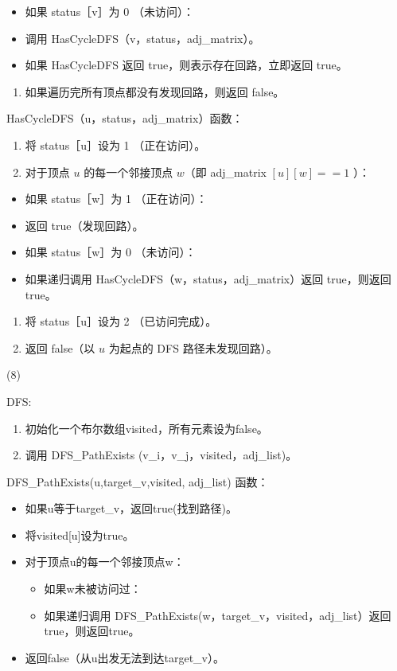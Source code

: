 \begin{itemize}
	\item 如果 status［v］为 0 （未访问）：
	\item 调用 HasCycleDFS（v，status，adj\_matrix）。
	\item 如果 HasCycleDFS 返回 true，则表示存在回路，立即返回 true。
\end{itemize}

\begin{enumerate}
	\item 如果遍历完所有顶点都没有发现回路，则返回 false。
\end{enumerate}

HasCycleDFS（u，status，adj\_matrix）函数：

\begin{enumerate}
	\item 将 status［u］设为 1 （正在访问）。
	\item 对于顶点 $u$ 的每一个邻接顶点 $w$（即 adj\_matrix $[u][w]==1$ ）：
\end{enumerate}

\begin{itemize}
	\item 如果 status［w］为 1 （正在访问）：
	\item 返回 true（发现回路）。
	\item 如果 status［w］为 0 （未访问）：
	\item 如果递归调用 HasCycleDFS（w，status，adj\_matrix）返回 true，则返回 true。
\end{itemize}

\begin{enumerate}
	\item 将 status［u］设为 2 （已访问完成）。
	\item 返回 false（以 $u$ 为起点的 DFS 路径未发现回路）。
\end{enumerate}


(8)

DFS:

\begin{enumerate}
	\item 初始化一个布尔数组visited，所有元素设为false。
	\item 调用 DFS\_PathExists (v\_i，v\_j，visited，adj\_list)。
\end{enumerate}

DFS\_PathExists(u,target\_v,visited, adj\_list) 函数：

\begin{itemize}
	\item 如果u等于target\_v，返回true(找到路径)。
	\item 将visited[u]设为true。
	\item 对于顶点u的每一个邻接顶点w：
	\begin{itemize}
		\item 如果w未被访问过：
		\item 如果递归调用 DFS\_PathExists(w，target\_v，visited，adj\_list）返回true，则返回true。
	\end{itemize}
	\item 返回false（从u出发无法到达target\_v）。
\end{itemize}

